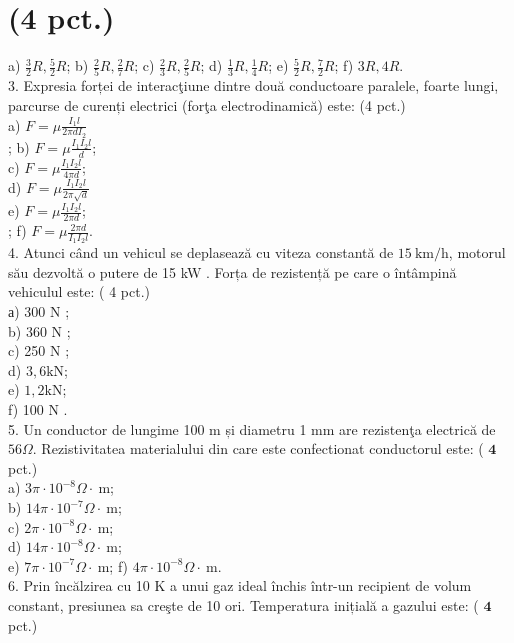 \section*{(4 pct.)}
a) $\frac{3}{2} R, \frac{5}{2} R$; b) $\frac{2}{5} R, \frac{2}{7} R$; c) $\frac{2}{3} R, \frac{2}{5} R$; d) $\frac{1}{3} R, \frac{1}{4} R$; e) $\frac{5}{2} R, \frac{7}{2} R$; f) $3 R, 4 R$.\\
3. Expresia forței de interacţiune dintre două conductoare paralele, foarte lungi, parcurse de curenți electrici (forţa electrodinamică) este: (4 pct.)\\
a) $F=\mu \frac{I_{1} l}{2 \pi d I_{2}}$\\
; b) $F=\mu \frac{I_{1} I_{2} l}{d}$;\\
c) $F=\mu \frac{I_{1} I_{2} l}{4 \pi d}$;\\
d) $F=\mu \frac{I_{1} I_{2} l}{2 \pi \sqrt{d}}$\\
e) $F=\mu \frac{I_{1} I_{2} l}{2 \pi d}$;\\
; f) $F=\mu \frac{2 \pi d}{I_{1} I_{2} l}$.\\
4. Atunci când un vehicul se deplasează cu viteza constantă de $15 \mathrm{~km} / \mathrm{h}$, motorul său dezvoltă o putere de 15 kW . Forța de rezistență pe care o întâmpină vehiculul este: ( 4 pct.)\\
а) 300 N ;\\
b) 360 N ;\\
c) 250 N ;\\
d) $3,6 \mathrm{kN}$;\\
e) $1,2 \mathrm{kN}$;\\
f) 100 N .\\
5. Un conductor de lungime 100 m și diametru 1 mm are rezistenţa electrică de $56 \Omega$. Rezistivitatea materialului din care este confectionat conductorul este: ( $\mathbf{4}$ pct.)\\
a) $3 \pi \cdot 10^{-8} \Omega \cdot \mathrm{~m}$;\\
b) $14 \pi \cdot 10^{-7} \Omega \cdot \mathrm{~m}$;\\
c) $2 \pi \cdot 10^{-8} \Omega \cdot \mathrm{~m}$;\\
d) $14 \pi \cdot 10^{-8} \Omega \cdot \mathrm{~m}$;\\
e) $7 \pi \cdot 10^{-7} \Omega \cdot \mathrm{~m}$; f) $4 \pi \cdot 10^{-8} \Omega \cdot \mathrm{~m}$.\\
6. Prin încălzirea cu 10 K a unui gaz ideal închis într-un recipient de volum constant, presiunea sa creşte de 10 ori. Temperatura inițială a gazului este: ( $\mathbf{4}$ pct.)\\

